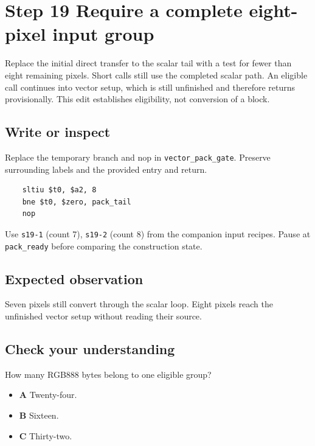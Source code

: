 \section{Step 19 Require a complete eight-pixel input group}\label{rgb-s19}

Replace the initial direct transfer to the scalar tail with a test for fewer than eight remaining pixels. Short calls still use the completed scalar path. An eligible call continues into vector setup, which is still unfinished and therefore returns provisionally. This edit establishes eligibility, not conversion of a block.

\subsection{Write or inspect}
Replace the temporary branch and nop in \texttt{vector\_pack\_gate}. Preserve surrounding labels and the provided entry and return.

\begin{verbatim}
    sltiu $t0, $a2, 8
    bne $t0, $zero, pack_tail
    nop
\end{verbatim}
Use \texttt{s19-1} (count 7), \texttt{s19-2} (count 8) from the companion input recipes. Pause at \texttt{pack\_ready} before comparing the construction state.

\subsection{Expected observation}
Seven pixels still convert through the scalar loop. Eight pixels reach the unfinished vector setup without reading their source.

\subsection{Check your understanding}
How many RGB888 bytes belong to one eligible group?

\begin{itemize}
  \item \textbf{A} Twenty-four.
  \item \textbf{B} Sixteen.
  \item \textbf{C} Thirty-two.
\end{itemize}
